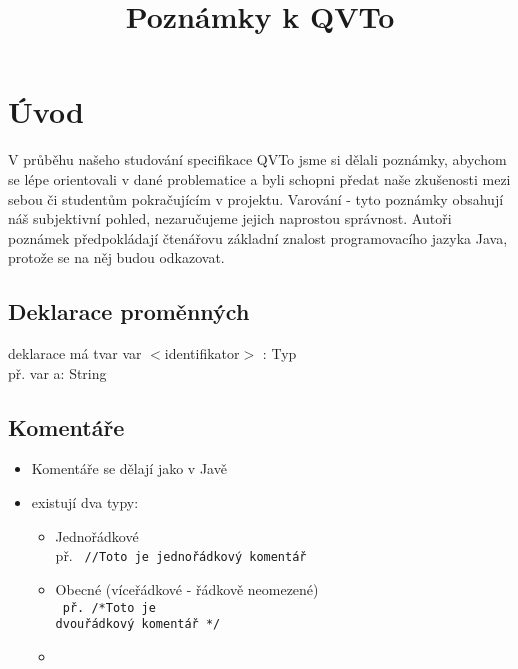 \documentclass[11pt,a4paper]{article}   	%
\begin{document}
\title{Poznámky k QVTo}
\section{Úvod}
V průběhu našeho studování specifikace QVTo jsme si dělali poznámky, abychom se
lépe orientovali v dané problematice a byli schopni předat naše zkušenosti mezi
sebou či studentům pokračujícím v projektu. Varování - tyto poznámky obsahují
náš subjektivní pohled, nezaručujeme jejich naprostou správnost. Autoři poznámek
předpokládají čtenářovu základní znalost programovacího jazyka Java, protože se
na něj budou odkazovat.

\subsection{Deklarace proměnných}
deklarace má tvar var $<$identifikator$>$ : Typ \\
př. var a: String

\subsection{Komentáře}
\begin{itemize}
  \item Komentáře se dělají jako v Javě
  \item existují dva typy:
  		\begin{itemize}
  		  	\item Jednořádkové\\  					%
				př. \texttt {						%
						//Toto je jednořádkový komentář
					}
  		  	\item Obecné (víceřádkové - řádkově neomezené)\\
				\texttt{ 
					př. /*Toto je\\
					dvouřádkový komentář */
				}
  		  	\item 
  		  \end{itemize}
\end{itemize}
\end{document}
